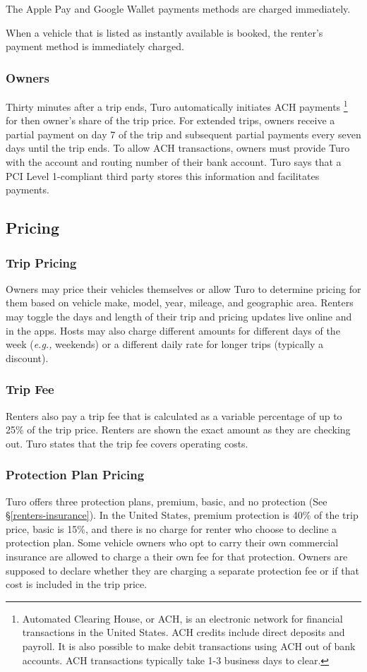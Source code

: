 \documentclass[review,12pt]{elsarticle}
\begin{document}
    The Apple Pay and Google Wallet payments methods are charged immediately.

    When a vehicle that is listed as instantly available is booked, the renter's payment method is immediately charged.

    \subsubsection{Owners}
    Thirty minutes after a trip ends, Turo automatically initiates ACH payments
    \footnote{Automated Clearing House, or ACH, is an electronic network for financial transactions in the United States. ACH credits include direct deposits and payroll. It is also possible to make debit transactions using ACH out of bank accounts. ACH transactions typically take 1-3 business days to clear.
    }
    for then owner's share of the trip price. For extended trips, owners receive a partial payment on day 7 of the trip and subsequent partial payments every seven days until the trip ends. To allow ACH transactions, owners must provide Turo with the account and routing number of their bank account. Turo says that a PCI Level 1-compliant third party stores this information and facilitates payments.

  \subsection{Pricing}
    \subsubsection{Trip Pricing}
    Owners may price their vehicles themselves or allow Turo to determine pricing for them based on vehicle make, model, year, mileage, and geographic area. Renters may toggle the days and length of their trip and pricing updates live online and in the apps. Hosts may also charge different amounts for different days of the week (\emph{e.g.,} weekends) or a different daily rate for longer trips (typically a discount).
    \subsubsection{Trip Fee}
    Renters also pay a trip fee that is calculated as a variable percentage of up to 25\% of the trip price. Renters are shown the exact amount as they are checking out. Turo states that the trip fee covers operating costs.
    \subsubsection{Protection Plan Pricing}
    Turo offers three protection plans, premium, basic, and no protection (See \S\ref{renters-insurance}). In the United States, premium protection is 40\% of the trip price, basic is 15\%, and there is no charge for renter who choose to decline a protection plan. Some vehicle owners who opt to carry their own commercial insurance are allowed to charge a their own fee for that protection. Owners are supposed to declare whether they are charging a separate protection fee or if that cost is included in the trip price.
\end{document}

